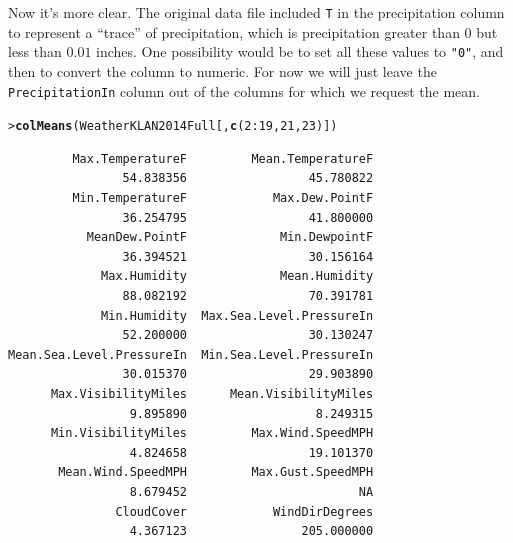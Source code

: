 \documentclass[12pt,oneside]{book}\usepackage[]{graphicx}\usepackage[]{color}
\makeatletter
\newcommand{\hlnum}[1]{\textcolor[rgb]{0.686,0.059,0.569}{#1}}%
\newcommand{\hlopt}[1]{\textcolor[rgb]{0,0,0}{#1}}%
\newcommand{\hlstd}[1]{\textcolor[rgb]{0.345,0.345,0.345}{#1}}%
\newcommand{\hlkwd}[1]{\textcolor[rgb]{0.737,0.353,0.396}{\textbf{#1}}}%
\newenvironment{kframe}{%
 \def\at@end@of@kframe{}%
 \ifinner\ifhmode%
  \def\at@end@of@kframe{\end{minipage}}%
  \begin{minipage}{\columnwidth}%
 \fi\fi%
 \def\FrameCommand##1{\hskip\@totalleftmargin \hskip-\fboxsep
 \colorbox{shadecolor}{##1}\hskip-\fboxsep
     \hskip-\linewidth \hskip-\@totalleftmargin \hskip\columnwidth}%
 \MakeFramed {\advance\hsize-\width
   \@totalleftmargin\z@ \linewidth\hsize
   \@setminipage}}%
 {\par\unskip\endMakeFramed%
 \at@end@of@kframe}
\newenvironment{knitrout}{}{} %
\makeatother
\begin{document}
Now it's more clear. The original data file included \verb+T+ in the precipitation column to represent a ``trace'' of precipitation, which is precipitation greater than $0$ but less than $0.01$ inches. One possibility would be to set all these values to \verb+"0"+, and then to convert the column to numeric. For now we will just leave the \verb+PrecipitationIn+ column out of the columns for which we request the mean.
\begin{knitrout}
\color{fgcolor}\begin{kframe}
\begin{alltt}
\hlstd{> }\hlkwd{colMeans}\hlstd{(WeatherKLAN2014Full[,} \hlkwd{c}\hlstd{(}\hlnum{2}\hlopt{:}\hlnum{19}\hlstd{,} \hlnum{21}\hlstd{,} \hlnum{23}\hlstd{)])}
\end{alltt}
\begin{verbatim}
         Max.TemperatureF         Mean.TemperatureF 
                54.838356                 45.780822 
         Min.TemperatureF            Max.Dew.PointF 
                36.254795                 41.800000 
           MeanDew.PointF             Min.DewpointF 
                36.394521                 30.156164 
             Max.Humidity             Mean.Humidity 
                88.082192                 70.391781 
             Min.Humidity  Max.Sea.Level.PressureIn 
                52.200000                 30.130247 
Mean.Sea.Level.PressureIn  Min.Sea.Level.PressureIn 
                30.015370                 29.903890 
      Max.VisibilityMiles      Mean.VisibilityMiles 
                 9.895890                  8.249315 
      Min.VisibilityMiles         Max.Wind.SpeedMPH 
                 4.824658                 19.101370 
       Mean.Wind.SpeedMPH         Max.Gust.SpeedMPH 
                 8.679452                        NA 
               CloudCover            WindDirDegrees 
                 4.367123                205.000000 
\end{verbatim}
\end{kframe}
\end{knitrout}
\end{document}
